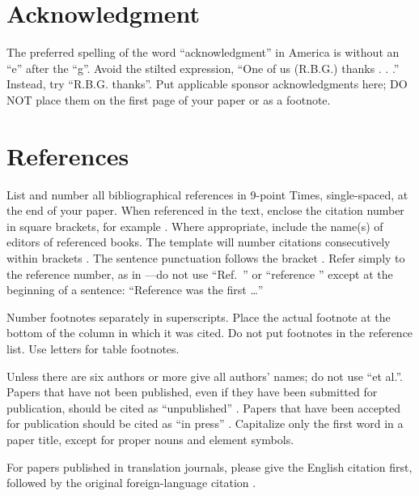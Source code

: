 \documentclass[conference,flushend]{iaria-lite}
\begin{document}
\section*{Acknowledgment}
The preferred spelling of the word “acknowledgment” in America is without an “e” after the “g”. Avoid the stilted expression, “One of us (R.B.G.) thanks . . .”  Instead, try 
“R.B.G. thanks”. Put applicable sponsor acknowledgments here; DO NOT place them on the first page of your paper or as a footnote.

\section*{References}
List and number all bibliographical references in 9-point Times, single-spaced, at the end of your paper. When referenced in the text, enclose the citation number in square brackets, for example \cite{eason1955certain}. Where appropriate, include the name(s) of editors of referenced books. The template will number citations consecutively within brackets \cite{eason1955certain}. The sentence punctuation follows the bracket \cite{maxwell1873treatise}. Refer simply to the reference number, as in \cite{jacobs1963fine}—do not use “Ref.\ \cite{jacobs1963fine}” or “reference \cite{jacobs1963fine}” except at the beginning of a sentence: “Reference \cite{jacobs1963fine} was the first \ldots”

Number footnotes separately in superscripts. Place the actual footnote at the bottom of the column in which it was cited. Do not put footnotes in the reference list. Use letters for table footnotes.

Unless there are six authors or more give all authors’ names; do not use “et al.”. Papers that have not been published, even if they have been submitted for publication, should be cited as “unpublished” \cite{four}. Papers that have been accepted for publication should be cited as “in press” \cite{five}. Capitalize only the first word in a paper title, except for proper nouns and element symbols.

For papers published in translation journals, please give the English citation first, followed by the original foreign-language citation \cite{yorozu1987electron}.

\nocite{kornack2001cell}
\nocite{kito2013emergent}
\nocite{goto2007efficient}


\vfill %
\begingroup
\sloppy
\printbibliography
\endgroup 
\end{document}
